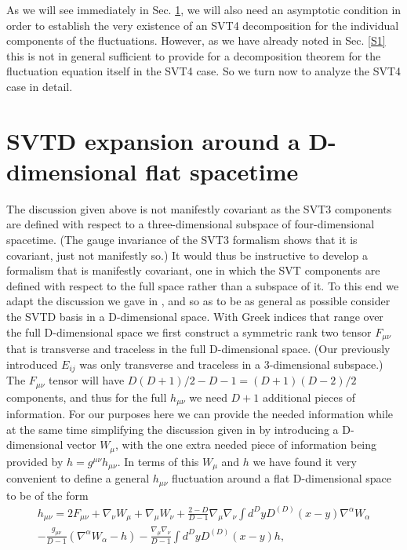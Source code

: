 \documentclass[aps,onecolumn,10pt]{revtex4}
\numberwithin{equation}{section}
\numberwithin{equation}{section}
\begin{document}
As we will see immediately in Sec. \ref{S3}, we will also need an asymptotic condition in order to establish the very existence of an SVT4 decomposition for the individual components of the fluctuations. However, as we have already noted in Sec. \ref{S1} this is not in general sufficient to provide for a decomposition theorem for the fluctuation equation itself in the SVT4 case. So we turn now to analyze the SVT4 case in detail. 

\section{SVTD expansion around a D-dimensional flat spacetime}
\label{S3}

The discussion given above is not manifestly covariant as the SVT3 components are defined with respect to a three-dimensional subspace of four-dimensional spacetime. (The gauge invariance of the SVT3 formalism shows that it is covariant, just not manifestly so.) It would thus be instructive to develop a formalism that is manifestly covariant, one in which the SVT components are defined with respect to the full space rather than a subspace of it. To this end we adapt the discussion we gave in \cite{Amarasinghe2018}, and so as to be as general as possible consider the SVTD basis in a D-dimensional space.  With Greek indices that range over the full D-dimensional space we first construct a symmetric rank two tensor $F_{\mu\nu}$  that is transverse and traceless in the full D-dimensional space. (Our previously introduced $E_{ij}$ was only transverse and traceless in a 3-dimensional subspace.) The $F_{\mu\nu}$ tensor will have $D(D+1)/2-D-1=(D+1)(D-2)/2$ components, and thus for the full $h_{\mu\nu}$ we need $D+1$ additional pieces of information. For our purposes here we can provide the needed information while at the same time simplifying the discussion given in \cite{Amarasinghe2018} by introducing a D-dimensional  vector $W_{\mu}$, with the one extra needed piece of information being provided by $h=g^{\mu\nu}h_{\mu\nu}$. In terms of this $W_{\mu}$ and $h$ we have found it very convenient to define a general $h_{\mu\nu}$ fluctuation around a flat D-dimensional space to be of the form
%
\begin{eqnarray}
h_{\mu\nu}=2F_{\mu\nu}+\nabla_{\nu}W_{\mu}+\nabla_{\mu}W_{\nu}+\frac{2-D}{D-1}\nabla_{\mu}\nabla_{\nu}\int d^DyD^{(D)}(x-y)\nabla^{\alpha}W_{\alpha}
\nonumber\\
-\frac{g_{\mu\nu}}{D-1}(\nabla^{\alpha}W_{\alpha}-h)-\frac{\nabla_{\mu}\nabla_{\nu}}{D-1}\int d^DyD^{(D)}(x-y)h,
\label{3.1}
\end{eqnarray}
\end{document}
